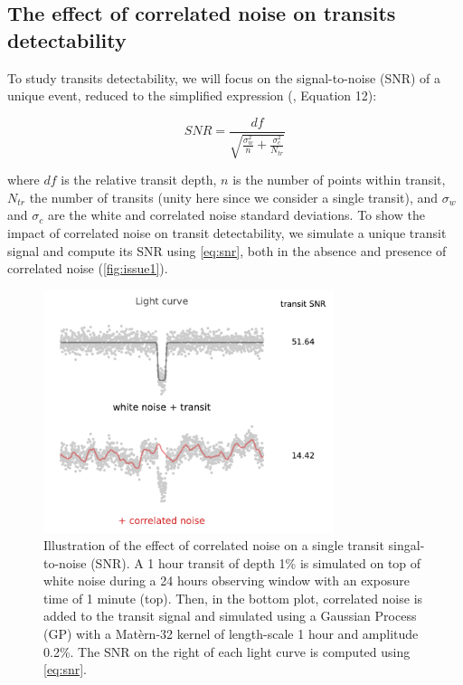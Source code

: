 \documentclass{aastex631}
\begin{document}
\subsection{The effect of correlated noise on transits detectability}

To study transits detectability, we will focus on the signal-to-noise (SNR) of a unique event, reduced to the simplified expression (\citealt{pont2006}, Equation 12):

\begin{equation}\label{eq:snr}
  SNR= \frac{df}{\sqrt{\frac{\sigma_w^2}{n} + \frac{\sigma_c^2}{N_{tr}}}}
\end{equation}

where $df$ is the relative transit depth, $n$ is the number of points within transit, $N_{tr}$ the number of transits (unity here since we consider a single transit), and $\sigma_w$ and $\sigma_c$ are the white and correlated noise standard deviations. To show the impact of correlated noise on transit detectability, we simulate a unique transit signal and compute its SNR using \autoref{eq:snr}, both in the absence and presence of correlated noise (\autoref{fig:issue1}).

\begin{figure}[H]
    \begin{centering}
        \includegraphics[width=8.5cm]{../figures/issue1.pdf}
        \caption{Illustration of the effect of correlated noise on a single transit singal-to-noise (SNR). A 1 hour transit of depth 1\% is simulated on top of white noise during a 24 hours observing window with an exposure time of 1 minute (top). Then, in the bottom plot, correlated noise is added to the transit signal and simulated using a Gaussian Process (GP) with a Matèrn-32 kernel of length-scale 1 hour and amplitude 0.2\%. The SNR on the right of each light curve is computed using \autoref{eq:snr}.}
        \label{fig:issue1}
    \end{centering}
\end{figure}
\end{document}
